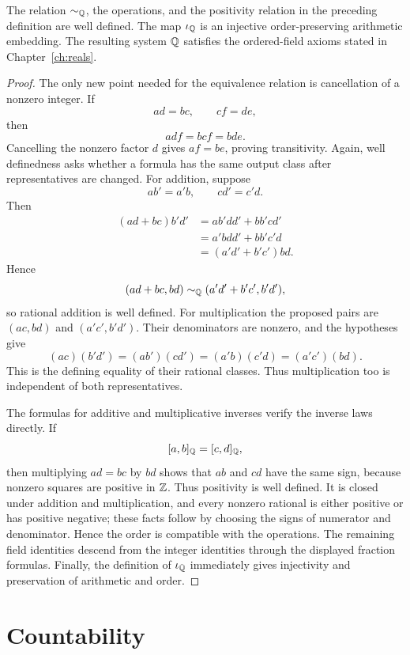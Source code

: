 \begin{proposition}
\label{prop:rational-arithmetic}
The relation \(\sim_{\mathbb{Q}}\), the operations, and the positivity relation in
the preceding definition are well defined.  The map \(\iota_{\mathbb{Q}}\) is an
injective order-preserving arithmetic embedding.  The resulting system
\(\mathbb{Q}\) satisfies the ordered-field axioms stated in Chapter~\ref{ch:reals}.
\end{proposition}
\begin{proof}
The only new point needed for the equivalence relation is cancellation of a
nonzero integer.  If
\[
ad=bc,
\qquad
cf=de,
\]
then
\[
adf=bcf=bde.
\]
Cancelling the nonzero factor \(d\) gives \(af=be\), proving transitivity.
Again, well definedness asks whether a formula has the same output class
after representatives are changed. For addition, suppose
\[
ab'=a'b,
\qquad
cd'=c'd.
\]
Then
\[
\begin{aligned}
(ad+bc)b'd'
&=ab'dd'+bb'cd'\\
&=a'bdd'+bb'c'd\\
&=(a'd'+b'c')bd.
\end{aligned}
\]
Hence
\[
(ad+bc,bd)\sim_{\mathbb{Q}}(a'd'+b'c',b'd'),
\]
so rational addition is well defined. For multiplication the proposed
pairs are $(ac,bd)$ and $(a'c',b'd')$. Their denominators are nonzero,
and the hypotheses give
\[
(ac)(b'd')=(ab')(cd')=(a'b)(c'd)=(a'c')(bd).
\]
This is the defining equality of their rational classes. Thus multiplication
too is independent of both representatives.

The formulas for additive and multiplicative inverses verify the
inverse laws directly.  If
\[
[a,b]_{\mathbb{Q}}=[c,d]_{\mathbb{Q}},
\]
then multiplying \(ad=bc\) by \(bd\) shows that \(ab\) and \(cd\) have the
same sign, because nonzero squares are positive in \(\mathbb{Z}\).  Thus positivity
is well defined.  It is closed under addition and multiplication, and every
nonzero rational is either positive or has positive negative; these facts
follow by choosing the signs of numerator and denominator.  Hence the order
is compatible with the operations.  The remaining field identities descend
from the integer identities through the displayed fraction formulas.  Finally,
the definition of \(\iota_{\mathbb{Q}}\) immediately gives injectivity and
preservation of arithmetic and order.
\end{proof}

\section{Countability}

